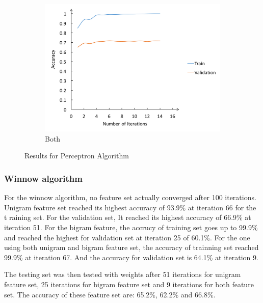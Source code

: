 \documentclass[11pt]{article}
\begin{document}
\begin{figure}
\hspace*{\fill} %
\begin{subfigure}{0.31\textwidth}
\includegraphics[width=\linewidth]{perceptron_both.png}
\caption{Both} \label{fig:1c}
\end{subfigure}
\caption{Results for Perceptron Algorithm} \label{fig:1}
\end{figure}
\subsubsection{Winnow algorithm}
For the winnow algorithm, no feature set actually converged after 100 iterations. Unigram feature set reached its highest accuracy of 93.9\% at iteration 66 for the t raining set. For the validation set, It reached its highest accuracy of 66.9\% at iteration 51. For the bigram feature, the accrucy of training set goes up to 99.9\% and reached the highest for validation set at iteration 25 of 60.1\%. For the one using both unigram and bigram feature set, the accuracy of trainning set reached 99.9\% at iteration 67. And the accuracy for validation set is 64.1\% at iteration 9.

The testing set was then tested with weights after 51 iterations for unigram feature set, 25 iterations for bigram feature set and 9 iterations for both feature set. The accuracy of these feature set are: 65.2\%, 62.2\% and 66.8\%.
\end{document}
